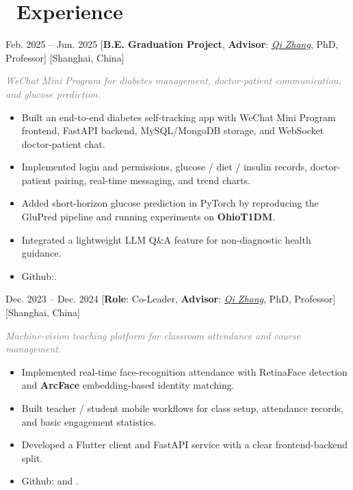 \documentclass{resume}
\newcommand{\projectgap}{\vspace{0.55em}}
\newcommand{\itemsummary}[1]{{\setlength{\parindent}{12pt}\small\textit{\textcolor{gray}{#1}}\par}}
\begin{document}
\section{\texorpdfstring{\faUsers\ }{}\textbf{Experience}}

{Feb. 2025 -- Jun. 2025}
[\textbf{B.E. Graduation Project}, \textbf{Advisor}: \href{https://scie.shu.edu.cn/Prof/zhangq.htm}{\textit{Qi Zhang}}, PhD, Professor]
[Shanghai, China]
\itemsummary{WeChat Mini Program for diabetes management, doctor-patient communication, and glucose prediction.}
\begin{itemize}
	\item Built an end-to-end diabetes self-tracking app with WeChat Mini Program frontend, FastAPI backend, MySQL/MongoDB storage, and WebSocket doctor-patient chat.
	\item Implemented login and permissions, glucose / diet / insulin records, doctor-patient pairing, real-time messaging, and trend charts.
	\item Added short-horizon glucose prediction in PyTorch by reproducing the GluPred pipeline and running experiments on \textbf{OhioT1DM}.
	\item Integrated a lightweight LLM Q\&A feature for non-diagnostic health guidance.
	\item Github:.
\end{itemize}

\projectgap

{Dec. 2023 -- Dec. 2024}
[\textbf{Role}: Co-Leader, \textbf{Advisor}: \href{https://scie.shu.edu.cn/Prof/zhangq.htm}{\textit{Qi Zhang}}, PhD, Professor]
[Shanghai, China]
\itemsummary{Machine-vision teaching platform for classroom attendance and course management.}
\begin{itemize}
	\item Implemented real-time face-recognition attendance with RetinaFace detection and \textbf{ArcFace} embedding-based identity matching.
	\item Built teacher / student mobile workflows for class setup, attendance records, and basic engagement statistics.
	\item Developed a Flutter client and FastAPI service with a clear frontend-backend split.
	\item Github:  and .
\end{itemize}
\end{document}
